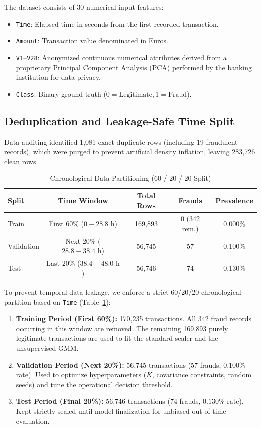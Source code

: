 \documentclass[10pt,journal,compsoc]{IEEEtran}
\begin{document}
The dataset consists of 30 numerical input features:
\begin{itemize}
    \item \texttt{Time}: Elapsed time in seconds from the first recorded transaction.
    \item \texttt{Amount}: Transaction value denominated in Euros.
    \item \texttt{V1}--\texttt{V28}: Anonymized continuous numerical attributes derived from a proprietary Principal Component Analysis (PCA) performed by the banking institution for data privacy.
    \item \texttt{Class}: Binary ground truth ($0 = \text{Legitimate}, 1 = \text{Fraud}$).
\end{itemize}

\subsection{Deduplication and Leakage-Safe Time Split}
Data auditing identified 1,081 exact duplicate rows (including 19 fraudulent records), which were purged to prevent artificial density inflation, leaving 283,726 clean rows.

\begin{table}[t]
\centering
\caption{Chronological Data Partitioning (60 / 20 / 20 Split)}
\label{tab:datasplit}
\begin{tabular}{lcccc}
\toprule
\textbf{Split} & \textbf{Time Window} & \textbf{Total Rows} & \textbf{Frauds} & \textbf{Prevalence} \\
\midrule
Train & First 60\% ($0 - 28.8\text{ h}$) & 169,893 & 0 (342 rem.) & 0.000\% \\
Validation & Next 20\% ($28.8 - 38.4\text{ h}$) & 56,745 & 57 & 0.100\% \\
Test & Last 20\% ($38.4 - 48.0\text{ h}$) & 56,746 & 74 & 0.130\% \\
\bottomrule
\end{tabular}
\end{table}

To prevent temporal data leakage, we enforce a strict 60/20/20 chronological partition based on \texttt{Time} (Table~\ref{tab:datasplit}):
\begin{enumerate}
    \item \textbf{Training Period (First 60\%):} 170,235 transactions. All 342 fraud records occurring in this window are removed. The remaining 169,893 purely legitimate transactions are used to fit the standard scaler and the unsupervised GMM.
    \item \textbf{Validation Period (Next 20\%):} 56,745 transactions (57 frauds, $0.100\%$ rate). Used to optimize hyperparameters ($K$, covariance constraints, random seeds) and tune the operational decision threshold.
    \item \textbf{Test Period (Final 20\%):} 56,746 transactions (74 frauds, $0.130\%$ rate). Kept strictly sealed until model finalization for unbiased out-of-time evaluation.
\end{enumerate}
\end{document}
